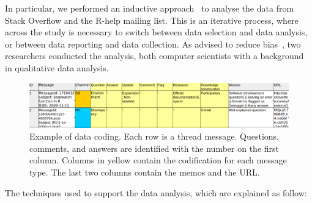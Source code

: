 \documentclass{sig-alternate-05-2015}
\begin{document}
In particular, we performed an inductive approach~\cite{Runeson2012} to analyse the data from Stack Overflow and the R-help mailing list.
This is an iterative process, where across the study is necessary to switch between data selection and data analysis, or between data reporting and data collection.
As advised to reduce bias~\cite{Runeson2012}, two researchers conducted the analysis, both computer scientists with a background in qualitative data analysis.

\begin{figure}[!htb]
	\centering
	\includegraphics[width=.85\textwidth]{Figures/CodingExample}
	\caption{Example of data coding. Each row is a thread message. Questions, comments, and answers are identified with the number on the first column. Columns in yellow contain the codification for each message type. The last two columns contain the memos and the URL.}
	\label{fig:CodingExample}
\end{figure}



The techniques used to support the data analysis, which are explained as follow:
\end{document}
